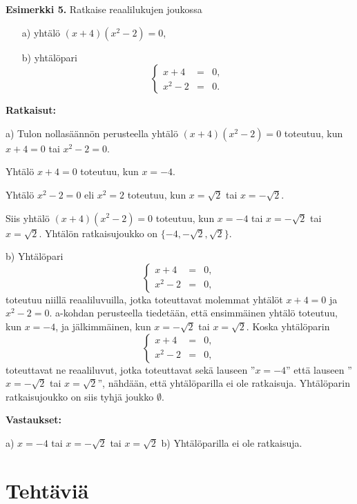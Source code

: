 {\bf Esimerkki 5.} Ratkaise reaalilukujen joukossa
\begin{itemize}
\item[a)] yhtälö $(x + 4)(x^2 - 2) = 0$,
\item[b)] yhtälöpari
\[
\left\{
\begin{array}{rcl}
x + 4 & = & 0, \\
x^2 - 2 & = & 0.
\end{array}\right.
\]
\end{itemize}

{\bf Ratkaisut:}

a) Tulon nollasäännön perusteella yhtälö $(x + 4)(x^2 -
2) = 0$ toteutuu, kun $x + 4 = 0$ tai $x^2 - 2 = 0$.

Yhtälö $x + 4 = 0$ toteutuu, kun $x = -4$.

Yhtälö $x^2 - 2 = 0$ eli $x^2 = 2$ toteutuu, kun $x =
\sqrt{2}$ tai $x = -\sqrt{2}$.

Siis yhtälö $(x + 4)(x^2 - 2) = 0$ toteutuu, kun $x =
-4$ tai $x = -\sqrt{2}$ tai $x = \sqrt{2}$. Yhtälön
ratkaisujoukko on $\{-4, -\sqrt{2}, \sqrt{2} \}$.

b) Yhtälöpari
\[
\left\{
\begin{array}{rcl}
x + 4 & = & 0, \\
x^2 - 2 & = & 0,
\end{array}\right.
\]
toteutuu niillä reaaliluvuilla, jotka toteuttavat
molemmat yhtälöt $x + 4 = 0$ ja $x^2 - 2 = 0$. a-kohdan
perusteella tiedetään, että ensimmäinen yhtälö toteutuu,
kun $x = -4$, ja jälkimmäinen, kun $x = -\sqrt{2}$ tai $x
= \sqrt{2}$. Koska yhtälöparin
\[
\left\{
\begin{array}{rcl}
x + 4 & = & 0, \\
x^2 - 2 & = & 0,
\end{array}\right.
\]
toteuttavat ne reaaliluvut, jotka toteuttavat sekä
lauseen ''$x = -4$'' että lauseen ''$x = -\sqrt{2}$ tai
$x = \sqrt{2}$'', nähdään, että yhtälöparilla ei ole
ratkaisuja. Yhtälöparin ratkaisujoukko on siis tyhjä
joukko $\emptyset$.

{\bf Vastaukset:}

a) $x = -4$ tai $x = -\sqrt{2}$ tai $x = \sqrt{2}$
b) Yhtälöparilla ei ole ratkaisuja.

\newpage


\section*{Tehtäviä}

